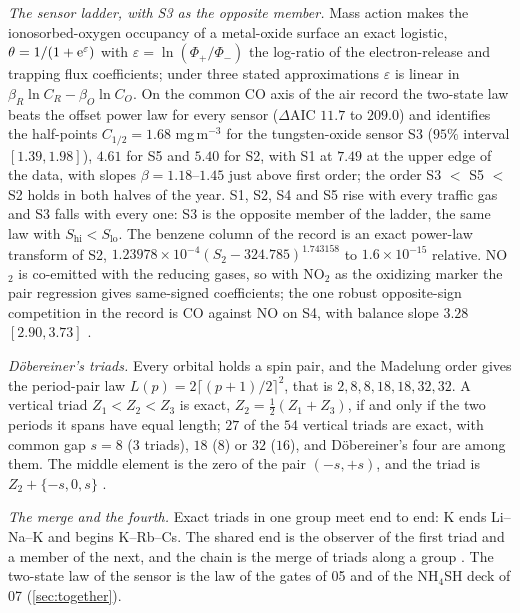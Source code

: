 \documentclass[11pt]{article}
\theoremstyle{definition}\newtheorem{definition}[theorem]{Definition}
\theoremstyle{remark}\newtheorem{remark}[theorem]{Remark}
\begin{document}
\emph{The sensor ladder, with S3 as the opposite member.} Mass action makes the ionosorbed-oxygen occupancy of a metal-oxide surface an exact logistic, $\theta=1/(1+\mathrm e^{\varepsilon})$ with $\varepsilon=\ln(\Phi_+/\Phi_-)$ the log-ratio of the electron-release and trapping flux coefficients; under three stated approximations $\varepsilon$ is linear in $\beta_R\ln C_R-\beta_O\ln C_O$. On the common CO axis of the air record the two-state law beats the offset power law for every sensor ($\Delta$AIC $11.7$ to $209.0$) and identifies the half-points $C_{1/2}=1.68$ mg\,m$^{-3}$ for the tungsten-oxide sensor S3 ($95\%$ interval $[1.39,1.98]$), $4.61$ for S5 and $5.40$ for S2, with S1 at $7.49$ at the upper edge of the data, with slopes $\beta=1.18$--$1.45$ just above first order; the order S3 $<$ S5 $<$ S2 holds in both halves of the year. S1, S2, S4 and S5 rise with every traffic gas and S3 falls with every one: S3 is the opposite member of the ladder, the same law with $S_{\mathrm{hi}}<S_{\mathrm{lo}}$. The benzene column of the record is an exact power-law transform of S2, $1.23978\times10^{-4}(S_2-324.785)^{1.743158}$ to $1.6\times10^{-15}$ relative. NO$_2$ is co-emitted with the reducing gases, so with NO$_2$ as the oxidizing marker the pair regression gives same-signed coefficients; the one robust opposite-sign competition in the record is CO against NO on S4, with balance slope $3.28$ $[2.90,3.73]$ \cite{SChem}.

\emph{Döbereiner's triads.} Every orbital holds a spin pair, and the Madelung order gives the period-pair law $L(p)=2\lceil(p+1)/2\rceil^2$, that is $2,8,8,18,18,32,32$. A vertical triad $Z_1<Z_2<Z_3$ is exact, $Z_2=\frac12(Z_1+Z_3)$, if and only if the two periods it spans have equal length; $27$ of the $54$ vertical triads are exact, with common gap $s=8$ ($3$ triads), $18$ ($8$) or $32$ ($16$), and Döbereiner's four are among them. The middle element is the zero of the pair $(-s,+s)$, and the triad is $Z_2+\{-s,0,s\}$ \cite{SChem}.

\emph{The merge and the fourth.} Exact triads in one group meet end to end: K ends Li--Na--K and begins K--Rb--Cs. The shared end is the observer of the first triad and a member of the next, and the chain is the merge of triads along a group \cite{SChem}. The two-state law of the sensor is the law of the gates of 05 and of the NH$_4$SH deck of 07 (\cref{sec:together}).
\end{document}
